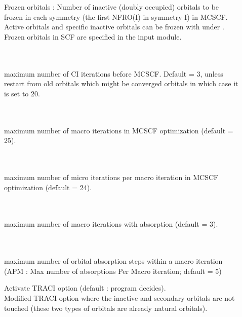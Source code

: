 \begin{description}
\item[] \ \\
   \\
  Frozen orbitals : Number of inactive (doubly occupied) orbitals to be frozen
  in each symmetry (the first NFRO(I) in symmetry I) in MCSCF.
  Active orbitals and specific inactive orbitals can be frozen with 
  under .
  Frozen orbitals in SCF are specified in the  input module.

\item[] \ \\
   \\
  maximum number of CI iterations before MCSCF.
  Default = 3, unless restart from old orbitals which might be converged orbitals
  in which case it is set to 20.

\item[] \ \\
   \\
  maximum number of macro iterations in MCSCF optimization (default = 25).

\item[] \ \\
   \\
  maximum number of micro iterations per macro iteration in MCSCF optimization
  (default = 24).

\item[] \ \\
   \\
  maximum number of macro iterations with 
  absorption (default = 3).

\item[] \ \\
   \\
  maximum number of orbital absorption steps within
  a macro iteration
  (APM : Max number of absorptions Per Macro iteration; default = 5)

\item[]
  Activate TRACI option (default : program decides).\\
  Modified TRACI option where the inactive and secondary orbitals are not
  touched (these two types of orbitals are already natural orbitals).


\end{description}
